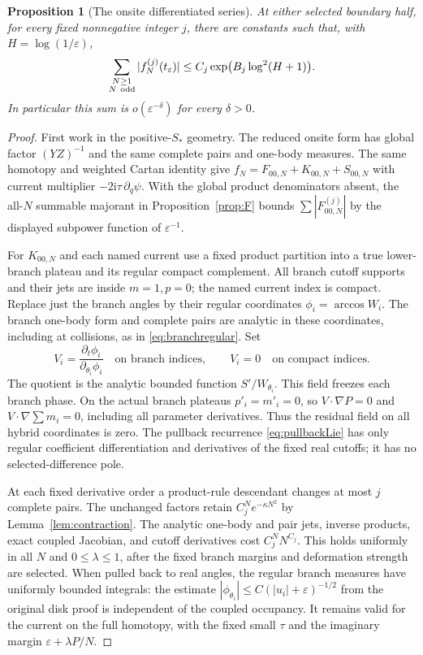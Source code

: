 \documentclass[11pt]{article}
\numberwithin{equation}{section}
\newtheorem{proposition}[theorem]{Proposition}
\theoremstyle{definition}
\newcommand{\ii}{\mathrm i}
\newcommand{\eps}{\varepsilon}
\begin{document}
\begin{proposition}[The onsite differentiated series]\label{prop:onsitesum}
At either selected boundary half, for every fixed nonnegative integer
$j$, there are constants such that, with $H=\log(1/\eps)$,
\[
 \sum_{\substack{N\ge1\\N\ {\rm odd}}}|f_N^{(j)}(t_\eps)|
 \le C_j\exp\bigl(B_j\log^2(H+1)\bigr).
\]
In particular this sum is $o(\eps^{-\delta})$ for every $\delta>0$.
\end{proposition}
\begin{proof}
First work in the positive-$S_*$ geometry. The reduced onsite form
has global factor $(YZ)^{-1}$ and the same complete pairs and
one-body measures. The same homotopy and weighted Cartan identity give
$f_N=F_{00,N}+K_{00,N}+S_{00,N}$ with current multiplier
$-2\ii\tau\,\partial_q\psi$. With the global product denominators absent,
the all-$N$ summable majorant in Proposition~\ref{prop:F} bounds
$\sum|F_{00,N}^{(j)}|$ by the displayed subpower function of $\eps^{-1}$.

For $K_{00,N}$ and each named current use a fixed product partition
into a true lower-branch plateau and its regular compact complement.
All branch cutoff supports and their jets are inside $m=1,p=0$;
the named current index is compact. Replace just the branch angles
by their regular coordinates $\phi_i=\arccos W_i$. The branch
one-body form and complete pairs are analytic in these coordinates,
including at collisions, as in \eqref{eq:branchregular}. Set
\[
 V_i=\frac{\partial_t\phi_i}{\partial_{\theta_i}\phi_i}
 \quad\text{on branch indices},\qquad V_i=0
 \quad\text{on compact indices}.
\]
The quotient is the analytic bounded function $S'/W_{\theta_i}$.
This field freezes each branch phase. On the actual branch plateaus
$p'_i=m'_i=0$, so $V\cdot\nabla P=0$ and
$V\cdot\nabla\sum m_i=0$, including all parameter derivatives.
Thus the residual field on all hybrid coordinates is zero. The
pullback recurrence \eqref{eq:pullbackLie} has only regular
coefficient differentiation and derivatives of the fixed real
cutoffs; it has no selected-difference pole.

At each fixed derivative order a product-rule descendant changes
at most $j$ complete pairs. The unchanged factors retain
$C_j^N e^{-\kappa N^2}$ by Lemma~\ref{lem:contraction}. The
analytic one-body and pair jets, inverse products, exact coupled
Jacobian, and cutoff derivatives cost $C_j^N N^{C_j}$. This holds
uniformly in all $N$ and $0\le\lambda\le1$, after the fixed
branch margins and deformation strength are selected. When pulled
back to real angles, the regular branch measures have uniformly
bounded integrals: the estimate
$|\phi_{\theta_i}|\le C(|u_i|+\eps)^{-1/2}$ from the original
disk proof is independent of the coupled occupancy. It remains
valid for the current on the full homotopy, with the fixed small
$\tau$ and the imaginary margin $\eps+\lambda P/N$.


\end{proof}
\end{document}
